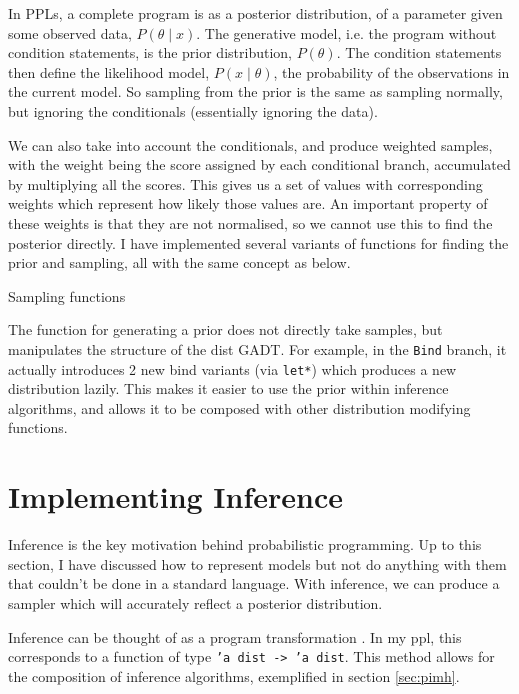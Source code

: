 In PPLs, a complete program is as a posterior distribution, of a parameter given some observed data, $P(\theta\mid x)$. The generative model, i.e. the program without condition statements, is the prior distribution, $P(\theta)$. The condition statements then define the likelihood model, $P(x\mid \theta)$, the probability of the observations in the current model. So sampling from the prior is the same as sampling normally, but ignoring the conditionals (essentially ignoring the data).
	
We can also take into account the conditionals, and produce weighted samples, with the weight being the score assigned by each conditional branch, accumulated by multiplying all the scores. This gives us a set of values with corresponding weights which represent how likely those values are. An important property of these weights is that they are not normalised, so we cannot use this to find the posterior directly. I have implemented several variants of functions for finding the prior and sampling, all with the same concept as below.
	
\begin{listing}[!htb]
	\centering
	\caption{Sampling functions}
	\label{lst:sampling}
\end{listing}
	
The function for generating a prior does not directly take samples, but manipulates the structure of the dist GADT. For example, in the \texttt{Bind} branch, it actually introduces 2 new bind variants (via \texttt{let*}) which produces a new distribution lazily. This makes it easier to use the prior within inference algorithms, and allows it to be composed with other distribution modifying functions.
	
\section{Implementing Inference} \label{sec:inference}

Inference is the key motivation behind probabilistic programming. Up to this section, I have discussed how to represent models but not do anything with them that couldn't be done in a standard language. With inference, we can produce a sampler which will accurately reflect a posterior distribution.
	
Inference can be thought of as a program transformation \cite{scibior2015practical, Zinkov2016ComposingIA}. In my ppl, this corresponds to a function of type \texttt{'a dist -> 'a dist}. This method allows for the composition of inference algorithms, exemplified in section \ref{sec:pimh}.
	
